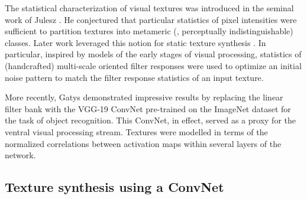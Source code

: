 The statistical characterization of visual textures was introduced
in the seminal work of Julesz \cite{julesz1962}.
He conjectured that particular statistics of pixel intensities
were sufficient to partition textures into metameric (\ie,
perceptually indistinguishable) classes. 
Later work leveraged this notion for static texture synthesis
\cite{heeger1995pyramid,portilla2000parametric}.
In particular, inspired by models of the early stages of visual 
processing, statistics of (handcrafted) multi-scale oriented filter 
responses were used to optimize an initial noise pattern 
to match the filter response statistics of an input texture.

More recently, Gatys \etal \cite{gatys2015} demonstrated
impressive results by replacing the linear filter bank with the VGG-19
\cite{simonyan2014very} ConvNet pre-trained on the ImageNet \cite{russakovsky2015} dataset for the task of object
recognition. This ConvNet, in effect, served as a proxy for the ventral visual
processing stream. 
Textures were modelled in terms of the normalized correlations between activation maps within several layers of the network.

\subsection{Texture synthesis using a ConvNet}
\label{sec:texture_synthesis_using_a_convnet}


